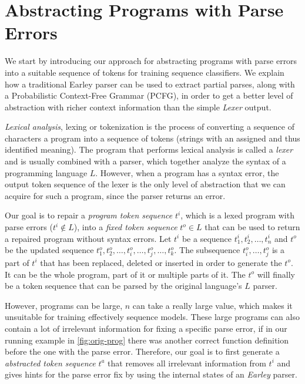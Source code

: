 \section{Abstracting Programs with Parse Errors}
\label{sec:prog-abstract}

We start by introducing our approach for abstracting programs with parse errors
into a suitable sequence of tokens for training sequence classifiers. We explain
how a traditional Earley parser can be used to extract partial parses, along
with a Probabilistic Context-Free Grammar (PCFG), in order to get a better level
of abstraction with richer context information than the simple \emph{Lexer}
output.



\emph{Lexical analysis}, lexing or tokenization is the process of converting a
sequence of characters \ie a program into a sequence of tokens (strings with an
assigned and thus identified meaning). The program that performs lexical
analysis is called a \emph{lexer} and is usually combined with a parser, which
together analyze the syntax of a programming language $L$. However, when a
program has a syntax error, the output token sequence of the lexer is the only
level of abstraction that we can acquire for such a program, since the parser
returns an error.

Our goal is to repair a \emph{program token sequence} $t^i$, which is a lexed
program with parse errors (\ie $t^i \notin L$), into a \emph{fixed token
sequence} $t^o \in L$ that can be used to return a repaired program without
syntax errors. Let $t^i$ be a sequence $t^i_1, t^i_2, \dots, t^i_n$ and $t^o$ be
the updated sequence $t^o_1, t^o_2, \dots, t^o_i, \dots, t^o_j, \dots, t^o_k$.
The subsequence $t^o_i, \dots, t^o_j$ is a part of $t^i$ that has been replaced,
deleted or inserted in order to generate the $t^o$. It can be the whole program,
part of it or multiple parts of it. The $t^o$ will finally be a token sequence
that can be parsed by the original language's $L$ parser.

However, programs can be large, \ie $n$ can take a really large value, which
makes it unsuitable for training effectively sequence models. These large
programs can also contain a lot of irrelevant information for fixing a specific
parse error, \eg if in our running example in \autoref{fig:orig-prog} there was
another correct function definition before the one with the parse error.
Therefore, our goal is to first generate a \emph{abstracted token sequence}
$t^a$ that removes all irrelevant information from $t^i$ and gives hints for the
parse error fix by using the internal states of an \emph{Earley} parser.


